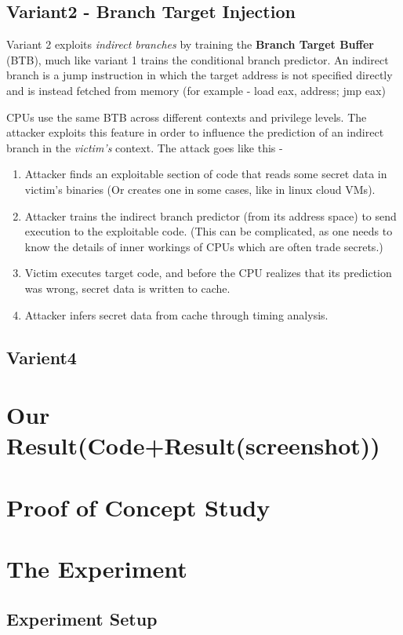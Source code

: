 \documentclass[12pt]{article}
\begin{document}
\subsection{Variant2 - Branch Target Injection}
Variant 2 exploits \textit{indirect branches} by training the \textbf{Branch Target Buffer} (BTB), much like variant 1 trains the conditional branch predictor. An indirect branch is a jump instruction in which the target address is not specified directly and is instead fetched from memory (for example - load eax, address; jmp eax)

CPUs use the same BTB across different contexts and privilege levels. The attacker exploits this feature in order to influence the prediction of an indirect branch in the \textit{victim's} context. The attack goes like this - 
 \begin{enumerate}
 \item Attacker finds an exploitable section of code that reads some secret data in victim's binaries (Or creates one in some cases, like in linux cloud VMs).
 \item Attacker trains the indirect branch predictor (from its address space) to send execution to the exploitable code. (This can be complicated, as one needs to know the details of inner workings of CPUs which are often trade secrets.)
 \item Victim executes target code, and before the CPU realizes that its prediction was wrong, secret data is written to cache.
 \item Attacker infers secret data from cache through timing analysis.
 \end{enumerate}
\subsection{Varient4}
\section{Our Result(Code+Result(screenshot))}
\section{Proof of Concept Study}
\section{The Experiment}
\subsection{Experiment Setup}
\end{document}
